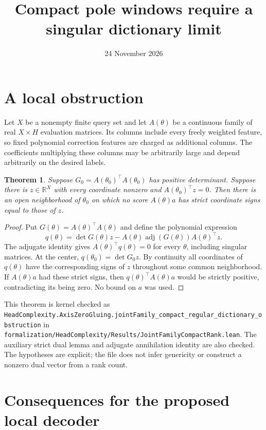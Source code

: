 \documentclass[11pt]{article}
\title{Compact pole windows require a singular dictionary limit}
\date{24 November 2026}
\newtheorem{theorem}{Theorem}
\begin{document}
\maketitle

\section{A local obstruction}

Let $X$ be a nonempty finite query set and let $A(\theta)$ be a continuous
family of real $X\times H$ evaluation matrices. Its columns include every
freely weighted feature, so fixed polynomial correction features are charged
as additional columns. The coefficients multiplying these columns may be
arbitrarily large and depend arbitrarily on the desired labels.

\begin{theorem}
Suppose $G_0=A(\theta_0)^\top A(\theta_0)$ has positive determinant. Suppose
there is $z\in\mathbb R^X$ with every coordinate nonzero and
$A(\theta_0)^\top z=0$. Then there is an open neighborhood of $\theta_0$
on which no score $A(\theta)a$ has strict coordinate signs equal to those
of $z$.
\end{theorem}

\begin{proof}
Put $G(\theta)=A(\theta)^\top A(\theta)$ and define the polynomial expression
\[
 q(\theta)=\det G(\theta)z-
 A(\theta)\operatorname{adj}(G(\theta))A(\theta)^\top z.
\]
The adjugate identity gives $A(\theta)^\top q(\theta)=0$ for every
$\theta$, including singular matrices. At the center,
$q(\theta_0)=\det G_0 z$. By continuity all coordinates of $q(\theta)$
have the corresponding signs of $z$ throughout some common neighborhood.
If $A(\theta)a$ had these strict signs, then
$q(\theta)^\top A(\theta)a$ would be strictly positive, contradicting
its being zero. No bound on $a$ was used.
\end{proof}

This theorem is kernel checked as
\texttt{HeadComplexity.AxisZeroGluing.jointFamily\_compact\_regular\_dictionary\_obstruction}
in
\texttt{formalization/HeadComplexity/Results/JointFamilyCompactRank.lean}.
The auxiliary strict dual lemma and adjugate annihilation identity are
also checked. The hypotheses are explicit; the file does not infer genericity
or construct a nonzero dual vector from a rank count.

\section{Consequences for the proposed local decoder}
\end{document}
